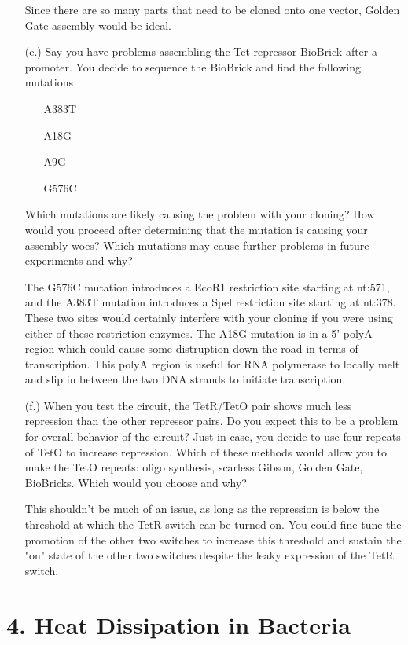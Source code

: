 \documentclass[11pt]{article}
\begin{document}
\begin{itemize}
Since there are so many parts that need to be cloned onto one vector, Golden Gate assembly would be ideal. 

\item[(e.)] Say you have problems assembling the Tet repressor BioBrick after a promoter. You decide to sequence the BioBrick and find the following mutations  

  \begin{itemize}
  \item[] A383T
  \item[] A18G
  \item[] A9G
  \item[] G576C
  \end{itemize}

Which mutations are likely causing the problem with your cloning? How would you proceed after determining that the mutation is causing your assembly woes? Which mutations may cause further problems in future experiments and why?

The G576C mutation introduces a EcoR1 restriction site starting at nt:571, and the A383T mutation introduces a Spel restriction site starting at nt:378. These two sites would certainly interfere with your cloning if you were using either of these restriction enzymes. The A18G mutation is in a 5' polyA region which could cause some distruption down the road in terms of transcription. This polyA region is useful for RNA polymerase to locally melt and slip in between the two DNA strands to initiate transcription.
\item[(f.)] When you test the circuit, the TetR/TetO pair shows much less repression than the other repressor pairs. Do you expect this to be a problem for overall behavior of the circuit? Just in case, you decide to use four repeats of TetO to increase repression. Which of these methods would allow you to make the TetO repeats: oligo synthesis, scarless Gibson, Golden Gate, BioBricks. Which would you choose and why?

This shouldn't be much of an issue, as long as the repression is below the threshold at which the TetR switch can be turned on. You could fine tune the promotion of the other two switches to increase this threshold and sustain the "on" state of the other two switches despite the leaky expression of the TetR switch. 
\end{itemize}

\section*{4. Heat Dissipation in Bacteria}
\end{document}

